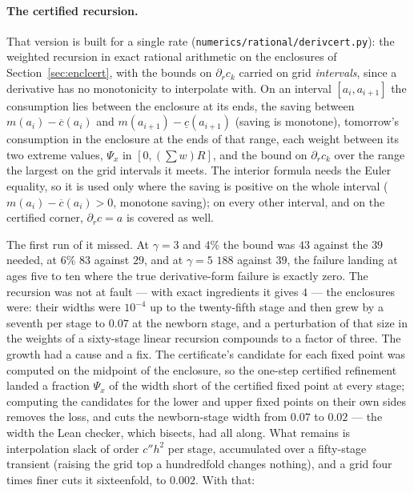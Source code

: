 \paragraph{The certified recursion.} That version is built for a single rate
(\texttt{numerics/rational/derivcert.py}): the weighted recursion in exact rational arithmetic on
the enclosures of Section~\ref{sec:enclcert}, with the bounds on $\partial_rc_k$ carried on grid
\emph{intervals}, since a derivative has no monotonicity to interpolate with. On an interval
$[a_i,a_{i+1}]$ the consumption lies between the enclosure at its ends, the saving between
$m(a_i)-\overline c(a_i)$ and $m(a_{i+1})-\underline c(a_{i+1})$ (saving is monotone), tomorrow's
consumption in the enclosure at the ends of that range, each weight between its two extreme values,
$\Psi_x$ in $[0,(\sum w)R]$, and the bound on $\partial_rc_k$ over the range the largest on the grid
intervals it meets. The interior formula needs the Euler equality, so it is used only where the
saving is positive on the whole interval ($m(a_i)-\overline c(a_i)>0$, monotone saving); on every
other interval, and on the certified corner, $\partial_rc=a$ is covered as well.

The first run of it missed. At $\gamma=3$ and $4\%$ the bound was $43$ against the $39$ needed, at
$6\%$ $83$ against $29$, and at $\gamma=5$ $188$ against $39$, the failure landing at ages five to ten
where the true derivative-form failure is exactly zero. The recursion was not at fault --- with exact
ingredients it gives $4$ --- the enclosures were: their widths were $10^{-4}$ up to the twenty-fifth
stage and then grew by a seventh per stage to $0.07$ at the newborn stage, and a perturbation of that
size in the weights of a sixty-stage linear recursion compounds to a factor of three. The growth had
a cause and a fix. The certificate's candidate for each fixed point was computed on the midpoint of
the enclosure, so the one-step certified refinement landed a fraction $\Psi_x$ of the width short of
the certified fixed point at every stage; computing the candidates for the lower and upper fixed
points on their own sides removes the loss, and cuts the newborn-stage width from $0.07$ to $0.02$
--- the width the Lean checker, which bisects, had all along. What remains is interpolation slack of
order $c''h^2$ per stage, accumulated over a fifty-stage transient (raising the grid top a hundredfold
changes nothing), and a grid four times finer cuts it sixteenfold, to $0.002$. With that:


